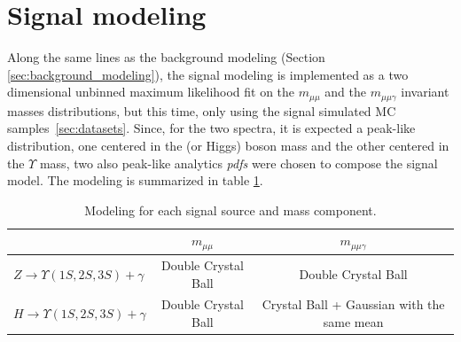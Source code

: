 \clearpage
\section{Signal modeling}

Along the same lines as the background modeling (Section \ref{sec:background_modeling}), the signal modeling is implemented as a two dimensional unbinned maximum likelihood fit on the $m_{\mu\mu}$ and the $m_{\mu\mu\gamma}$ invariant masses distributions, but this time, only using the signal simulated MC samples~\ref{sec:datasets}. Since, for the two spectra, it is expected a peak-like distribution, one centered in the \Z (or Higgs) boson mass and the other centered in the $\Upsilon$ mass, two also peak-like analytics \textit{pdfs} were chosen to compose the signal model. The modeling is summarized in table \ref{tab:SignalModeling}.





\begin{table}[ht]
\begin{center}
\caption{Modeling for each signal source and mass component.}
\begin{tabular}{l|c|c}
                         & \boldmath$m_{\mu\mu}$                                          & \boldmath$m_{\mu\mu\gamma}$       \\ \hline 
\textbf{\boldmath$Z \rightarrow \Upsilon(1S,2S,3S) +\gamma$}       & Double Crystal Ball & Double Crystal Ball      \\ \hline
\textbf{\boldmath$H \rightarrow \Upsilon(1S,2S,3S) +\gamma$} & Double Crystal Ball & Crystal Ball + Gaussian with the same mean  \\ 
\end{tabular}

\label{tab:SignalModeling}
\end{center}
\end{table}




